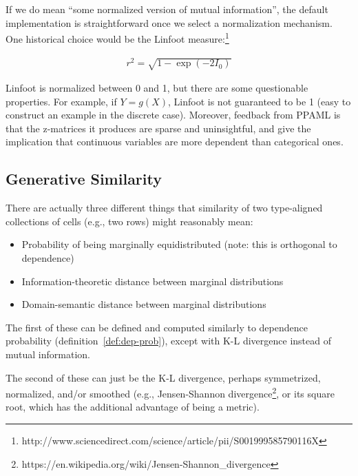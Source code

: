 \documentclass[10pt,letterpaper]{article}
\begin{document}
If we do mean ``some normalized version of mutual information'', the
default implementation is straightforward once we select a
normalization mechanism.  One historical choice would be the Linfoot
measure:\footnote{http://www.sciencedirect.com/science/article/pii/S001999585790116X}

\begin{align*}
r^2 = \sqrt{1 - \exp{(-2I_0)}}
\end{align*}

Linfoot is normalized between 0 and 1, but there are some questionable
properties.  For example, if $Y=g(X)$, Linfoot is not guaranteed to be
1 (easy to construct an example in the discrete case).  Moreover, feedback
from PPAML is that the z-matrices it produces are sparse and
uninsightful, and give the implication that continuous variables are
more dependent than categorical ones.


\subsection{Generative Similarity}

There are actually three different things that similarity of two
type-aligned collections of cells (e.g., two rows) might reasonably
mean:

\begin{itemize}
\item Probability of being marginally equidistributed (note: this is
  orthogonal to dependence)
\item Information-theoretic distance between marginal distributions
\item Domain-semantic distance between marginal distributions
\end{itemize}

The first of these can be defined and computed similarly to dependence
probability (definition~\ref{def:dep-prob}), except with K-L
divergence instead of mutual information.

The second of these can just be the K-L divergence, perhaps
symmetrized, normalized, and/or smoothed (e.g., Jensen-Shannon
divergence\footnote{https://en.wikipedia.org/wiki/Jensen-Shannon\_divergence},
or its square root, which has the additional advantage of being a metric).
\end{document}
